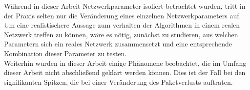 	Während in dieser Arbeit Netzwerkparameter isoliert betrachtet wurden, tritt in der Praxis selten nur die Veränderung eines einzelnen Netzwerkparameters auf. Um eine realistischere Aussage zum verhalten der Algorithmen in einem realen Netzwerk treffen zu können, wäre es nötig, zunächst zu studieren, aus welchen Parametern sich ein reales Netzwerk zusammensetzt und eine entsprechende Kombination dieser Parameter zu testen.\\
	
	Weiterhin wurden in dieser Arbeit einige Phänomene beobachtet, die im Umfang dieser Arbeit nicht abschließend geklärt werden können. Dies ist der Fall bei den signifikanten Spitzen, die bei einer Veränderung des Paketverlusts auftraten.
